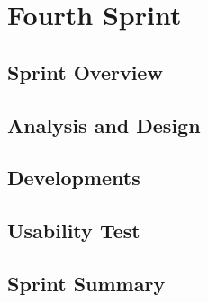 \chapter{Fourth Sprint}\label{chap:sprint4}
\section{Sprint Overview}\label{sec:sprint4:sprintoverview}


\section{Analysis and Design}





\section{Developments}\label{sec:sprint4:developments}







\section{Usability Test}


\section{Sprint Summary}\label{sec:sprint4:sprintreview}
